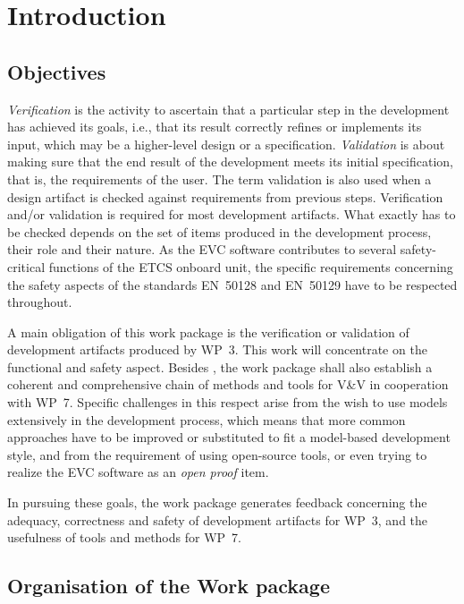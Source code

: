 \section*{Introduction}

\subsection*{Objectives}

\emph{Verification} is the activity to ascertain that a particular
step in the development has achieved its goals, i.e., that its result
correctly refines or implements its input, which may be a higher-level
design or a specification. \emph{Validation} is about making sure that
the end result of the development meets its initial specification,
that is, the requirements of the user. The term validation is also
used when a design artifact is checked against requirements from
previous steps. Verification and/or validation is required for most
development artifacts.  What exactly has to be checked depends on the
set of items produced in the development process, their role and their
nature.  As the EVC software contributes to several safety-critical
functions of the ETCS onboard unit, the specific requirements
concerning the safety aspects of the standards EN~50128 and EN~50129
have to be respected throughout.

A main obligation of this work package is the verification or
validation of development artifacts produced by WP~3. This work will
concentrate on the functional and safety aspect. Besides \vv,
the work package shall also establish a coherent and comprehensive
chain of methods and tools for V\&V in cooperation with WP~7. Specific
challenges in this respect arise from the wish to use models
extensively in the development process, which means that more common
approaches have to be improved or substituted to fit a
model-based development style, and from the requirement of
using open-source tools, or even trying to realize the EVC software as
an \emph{open proof} item.

In pursuing these goals, the work package generates feedback
concerning the adequacy, correctness and safety of development
artifacts for WP~3, and the usefulness of tools and methods for WP~7.  

\subsection*{Organisation of the Work package}

